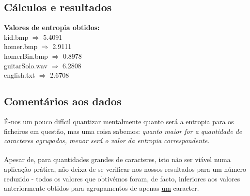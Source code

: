 \documentclass{article}
\begin{document}
\subsection{Cálculos e resultados}

\textbf{Valores de entropia obtidos:}\\
kid.bmp $\Rightarrow$ 5.4091\\
homer.bmp $\Rightarrow$ 2.9111\\
homerBin.bmp $\Rightarrow$ 0.8978\\
guitarSolo.wav $\Rightarrow$ 6.2808\\
english.txt $\Rightarrow$ 2.6708\\

\subsection{Comentários aos dados}

É-nos um pouco difícil quantizar mentalmente quanto será a entropia para os ficheiros em questão, mas uma coisa sabemos: \textit{quanto maior for a quantidade de caracteres agrupados, menor será o valor da entropia correspondente}. \\\\Apesar de, para quantidades grandes de caracteres, isto não ser viável numa aplicação prática, não deixa de se verificar nos nossos resultados para um número reduzido - todos os valores que obtivémos foram, de facto, inferiores aos valores anteriormente obtidos para agrupamentos de apenas \underline{um} caracter.
\end{document}
